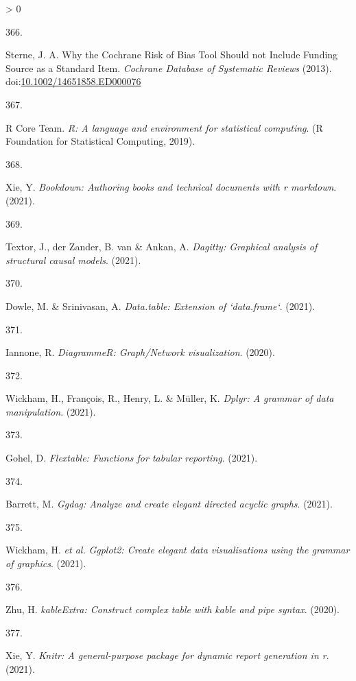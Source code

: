 \documentclass[a4paper, twoside]{templates/ociamthesis}
\newlength{\cslhangindent}
\newlength{\csllabelwidth}
\newenvironment{CSLReferences}[3] %
 {%
  \setlength{\parindent}{0pt}
  \ifodd #1 \everypar{\setlength{\hangindent}{\cslhangindent}}\ignorespaces\fi
  \ifnum #2 > 0
  \setlength{\parskip}{#2\baselineskip}
  \fi
 }%
 {}
\newcommand{\CSLLeftMargin}[1]{\parbox[t]{\maxof{\widthof{#1}}{\csllabelwidth}}{#1}}
\newcommand{\CSLRightInline}[1]{\parbox[t]{\linewidth - \csllabelwidth}{#1}}
\begin{document}
\begin{CSLReferences}{0}{0}
\leavevmode\hypertarget{ref-sterne2013}{}%
\CSLLeftMargin{366. }
\CSLRightInline{Sterne, J. A. Why the {Cochrane Risk} of {Bias Tool Should} not {Include Funding Source} as a {Standard Item}. \emph{Cochrane Database of Systematic Reviews} (2013). doi:\href{https://doi.org/10.1002/14651858.ED000076}{10.1002/14651858.ED000076}}

\leavevmode\hypertarget{ref-R-base}{}%
\CSLLeftMargin{367. }
\CSLRightInline{R Core Team. \emph{R: A language and environment for statistical computing}. ({R Foundation for Statistical Computing}, 2019).}

\leavevmode\hypertarget{ref-R-bookdown}{}%
\CSLLeftMargin{368. }
\CSLRightInline{Xie, Y. \emph{Bookdown: Authoring books and technical documents with r markdown}. (2021).}

\leavevmode\hypertarget{ref-R-dagitty}{}%
\CSLLeftMargin{369. }
\CSLRightInline{Textor, J., der Zander, B. van \& Ankan, A. \emph{Dagitty: Graphical analysis of structural causal models}. (2021).}

\leavevmode\hypertarget{ref-R-data.table}{}%
\CSLLeftMargin{370. }
\CSLRightInline{Dowle, M. \& Srinivasan, A. \emph{Data.table: Extension of `data.frame`}. (2021).}

\leavevmode\hypertarget{ref-R-DiagrammeR}{}%
\CSLLeftMargin{371. }
\CSLRightInline{Iannone, R. \emph{{DiagrammeR}: Graph/{Network} visualization}. (2020).}

\leavevmode\hypertarget{ref-R-dplyr}{}%
\CSLLeftMargin{372. }
\CSLRightInline{Wickham, H., François, R., Henry, L. \& Müller, K. \emph{Dplyr: A grammar of data manipulation}. (2021).}

\leavevmode\hypertarget{ref-R-flextable}{}%
\CSLLeftMargin{373. }
\CSLRightInline{Gohel, D. \emph{Flextable: Functions for tabular reporting}. (2021).}

\leavevmode\hypertarget{ref-R-ggdag}{}%
\CSLLeftMargin{374. }
\CSLRightInline{Barrett, M. \emph{Ggdag: Analyze and create elegant directed acyclic graphs}. (2021).}

\leavevmode\hypertarget{ref-R-ggplot2}{}%
\CSLLeftMargin{375. }
\CSLRightInline{Wickham, H. \emph{et al.} \emph{Ggplot2: Create elegant data visualisations using the grammar of graphics}. (2021).}

\leavevmode\hypertarget{ref-R-kableExtra}{}%
\CSLLeftMargin{376. }
\CSLRightInline{Zhu, H. \emph{{kableExtra}: Construct complex table with kable and pipe syntax}. (2020).}

\leavevmode\hypertarget{ref-R-knitr}{}%
\CSLLeftMargin{377. }
\CSLRightInline{Xie, Y. \emph{Knitr: A general-purpose package for dynamic report generation in r}. (2021).}


\end{CSLReferences}
\end{document}
